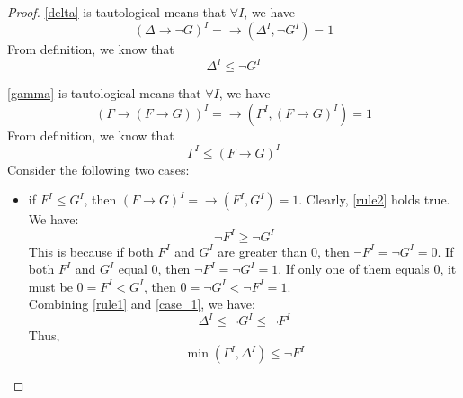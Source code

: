\documentclass[12pt]{article}
\begin{document}
\begin{proof}
\eqref{delta} is tautological means that $\forall I$, we have 
\begin{equation*}
(\Delta \rightarrow \neg G)^I = \rightarrow (\Delta^I, \neg G^I) = 1
\end{equation*}
From definition, we know that 
\begin{equation}
\label{rule1}
\Delta^I \leq \neg G^I
\end{equation}

\eqref{gamma} is tautological means that $\forall I$, we have 
\begin{equation*}
(\Gamma \rightarrow (F \rightarrow G))^I = \rightarrow (\Gamma^I, (F \rightarrow G)^I) = 1
\end{equation*}
From definition, we know that 
\begin{equation}
\label{rule2}
\Gamma^I \leq (F \rightarrow G)^I
\end{equation}
Consider the following two cases:
\begin{itemize}
\item if $F^I \leq G^I$, then $(F \rightarrow G)^I = \rightarrow (F^I, G^I) = 1$. Clearly, \eqref{rule2} holds true. We have:
\begin{equation}
\label{case_1}
\neg F^I \geq \neg G^I
\end{equation}
This is because if both $F^I$ and $G^I$ are greater than 0, then $\neg F^I = \neg G^I = 0$. If both $F^I$ and $G^I$ equal 0, then $\neg F^I = \neg G^I = 1$. If only one of them equals 0, it must be $0 = F^I < G^I$, then $0 = \neg G^I < \neg F^I = 1$. \\
Combining \eqref{rule1} and \eqref{case_1}, we have:
\begin{equation*}
\Delta^I \leq \neg G^I \leq \neg F^I
\end{equation*}
Thus, 
\begin{equation*}
\min(\Gamma^I, \Delta^I) \leq \neg F^I
\end{equation*}



\end{itemize}
\end{proof}
\end{document}
